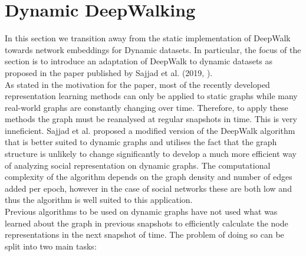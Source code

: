 \documentclass[a4paper]{article}
\begin{document}
\section{Dynamic DeepWalking}
In this section we transition away from the static implementation of DeepWalk
towards network embeddings for Dynamic datasets. In particular, the focus of the
section is to introduce an adaptation of DeepWalk to dynamic datasets as
proposed in the paper published by Sajjad et al. (2019, \cite{sajjad2019}).\\
As stated in the motivation for the paper, most of the recently developed
representation learning methods can only be applied to static graphs while many
real-world graphs are constantly changing over time. Therefore, to apply these
methods the graph must be reanalysed at regular snapshots in time. This is very
inneficient. Sajjad et al. proposed a modified version of the DeepWalk
algorithm that is better suited to dynamic graphs and utilises the fact that the
graph structure is unlikely to change significantly to develop a much more
efficient way of analyzing social representation on dynamic graphs.
The computational complexity of the algorithm depends on the graph density and
number of edges added per epoch, however in the case of social networks these
are both low and thus the algorithm is well suited to this application.\\
Previous algorithms to be used on dynamic graphs have not used what
was learned about the graph in previous snapshots to efficiently calculate the
node representations in the next snapshot of time. The problem of doing so can
be split into two main tasks:
\end{document}
